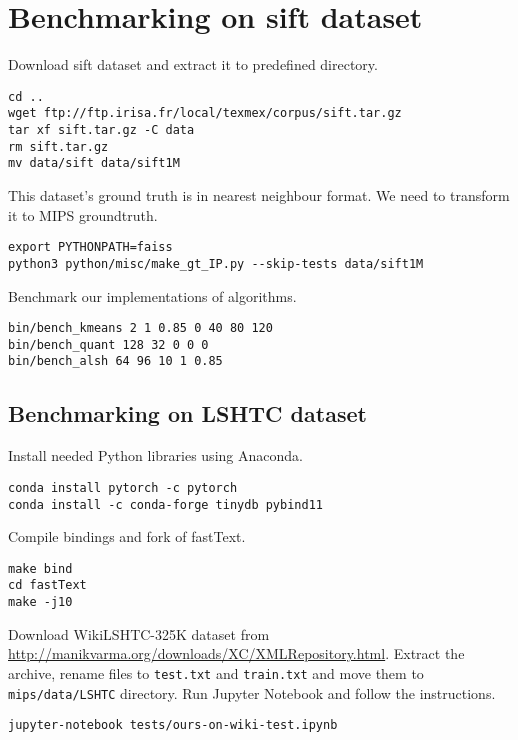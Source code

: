 \section{Benchmarking on sift dataset}
\noindent
Download sift dataset and extract it to predefined directory.
\begin{verbatim}
cd ..
wget ftp://ftp.irisa.fr/local/texmex/corpus/sift.tar.gz
tar xf sift.tar.gz -C data
rm sift.tar.gz
mv data/sift data/sift1M
\end{verbatim}
This dataset's ground truth is in nearest neighbour format.
We need to transform it to MIPS groundtruth.
\begin{verbatim}
export PYTHONPATH=faiss
python3 python/misc/make_gt_IP.py --skip-tests data/sift1M
\end{verbatim}
Benchmark our implementations of algorithms.
\begin{verbatim}
bin/bench_kmeans 2 1 0.85 0 40 80 120
bin/bench_quant 128 32 0 0 0
bin/bench_alsh 64 96 10 1 0.85
\end{verbatim}
\subsection{Benchmarking on LSHTC dataset}
\noindent
Install needed Python libraries using Anaconda.
\begin{verbatim}
conda install pytorch -c pytorch
conda install -c conda-forge tinydb pybind11
\end{verbatim}
Compile bindings and fork of fastText.
\begin{verbatim}
make bind
cd fastText
make -j10
\end{verbatim}
Download WikiLSHTC-325K dataset from \url{http://manikvarma.org/downloads/XC/XMLRepository.html}.
Extract the archive, rename files to \texttt{test.txt} and \texttt{train.txt} and move them to \texttt{mips/data/LSHTC} directory.
Run Jupyter Notebook and follow the instructions.
\begin{verbatim}
jupyter-notebook tests/ours-on-wiki-test.ipynb 
\end{verbatim}
